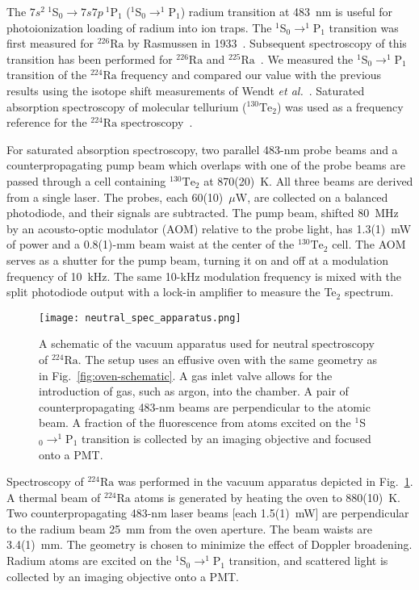 \documentclass[
 reprint,
 amsmath,amssymb,
 aps,
 prr,
 superscriptaddress,
]{revtex4-2}
\newcommand{\iso}[2]{\ensuremath{^{#2}\mathrm{#1}}}
\begin{document}
The \mbox{$7s^2\ ^1$S$_0 \rightarrow 7s7p\ ^1$P$_1$} (\mbox{$^1$S$_0 \rightarrow ^1$P$_1$}) radium transition at 483~nm is useful for photoionization loading of radium into ion traps. The \mbox{$^1$S$_0 \rightarrow ^1$P$_1$} transition was first measured for \iso{Ra}{226} by Rasmussen in 1933~\cite{Rasmussen1933}. Subsequent spectroscopy of this transition has been performed for \iso{Ra}{226} and \iso{Ra}{225}~\cite{Trimble2009,Santra2014}. We measured the \mbox{$^1$S$_0 \rightarrow ^1$P$_1$} transition of the \iso{Ra}{224} frequency and compared our value with the previous results using the isotope shift measurements of Wendt \emph{et al.}~\cite{Wendt1987}. Saturated absorption spectroscopy of molecular tellurium (\iso{Te}{130}$_2$) was used as a frequency reference for the \iso{Ra}{224} spectroscopy~\cite{Santra2014}.

For saturated absorption spectroscopy, two parallel 483-nm probe beams and a counterpropagating pump beam which overlaps with one of the probe beams are passed through a cell containing \iso{Te}{130}$_2$ at 870(20)~K. All three beams are derived from a single laser. The probes, each 60(10)~$\mu$W, are collected on a balanced photodiode, and their signals are subtracted. The pump beam, shifted 80~MHz by an acousto-optic modulator (AOM) relative to the probe light, has 1.3(1)~mW of power and a 0.8(1)-mm beam waist at the center of the \iso{Te}{130}$_2$ cell. The AOM serves as a shutter for the pump beam, turning it on and off at a modulation frequency of 10~kHz. The same 10-kHz modulation frequency is mixed with the split photodiode output with a lock-in amplifier to measure the Te$_2$ spectrum. 

\begin{figure}[h]
    \centering
    \texttt{[image: neutral\_spec\_apparatus.png]}
    \caption{A schematic of the vacuum apparatus used for neutral spectroscopy of \iso{Ra}{224}. The setup uses an effusive oven with the same geometry as in Fig.~\ref{fig:oven-schematic}. A gas inlet valve allows for the introduction of gas, such as argon, into the chamber. A pair of counterpropagating 483-nm beams are perpendicular to the atomic beam. A fraction of the fluorescence from atoms excited on the \mbox{$^1$S$_{0} \rightarrow ^1$P$_1$} transition is collected by an imaging objective and focused onto a PMT.}
    \label{fig:neutral-spec-apparatus}
\end{figure}

Spectroscopy of \iso{Ra}{224} was performed in the vacuum apparatus depicted in Fig.~\ref{fig:neutral-spec-apparatus}. A thermal beam of \iso{Ra}{224} atoms is generated by heating the oven to 880(10)~K. Two counterpropagating 483-nm laser beams [each 1.5(1)~mW] are perpendicular to the radium beam 25~mm from the oven aperture. The beam waists are 3.4(1)~mm. The geometry is chosen to minimize the effect of Doppler broadening. Radium atoms are excited on the \mbox{$^1$S$_0 \rightarrow ^1$P$_1$} transition, and scattered light is collected by an imaging objective onto a PMT.
\end{document}
